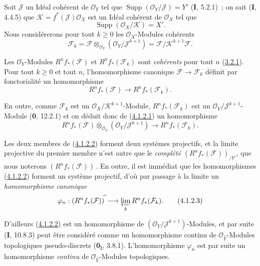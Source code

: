 \begin{env}[4.1.2]
\label{III.4.1.2-fr}
Soit $\mathcal J$ un Idéal cohérent de $\mathcal O_Y$ tel que
$\operatorname{Supp}(\mathcal O_Y/\mathcal J)=Y'$ (\textbf{I}, 5.2.1)~; on sait
(\textbf{I}, 4.4.5) que
$\mathcal K=f^*(\mathcal J)\mathcal O_X$
est un Idéal cohérent de $\mathcal O_X$ tel que
\[
\operatorname{Supp}(\mathcal O_X/\mathcal K)=X'.
\]
Nous considérerons pour tout $k\geq0$ les $\mathcal O_X$-Modules cohérents
\[
\mathcal F_k
=\mathcal F\otimes_{\mathcal O_Y}(\mathcal O_Y/\mathcal J^{k+1})
=\mathcal F/\mathcal K^{k+1}\mathcal F.
\]

Les $\mathcal O_Y$-Modules $R^nf_*(\mathcal F)$ et
$R^nf_*(\mathcal F_k)$ sont \emph{cohérents} pour tout $n$
(\hyperref[III.3.2.1-fr]{3.2.1}). Pour tout $k\geq0$ et tout $n$,
l'homomorphisme canonique $\mathcal F\to\mathcal F_k$ définit par
fonctorialité un homomorphisme
\[
R^nf_*(\mathcal F)\longrightarrow R^nf_*(\mathcal F_k).
\tag{4.1.2.1}\label{III.4.1.2.1-fr}
\]

En outre, comme $\mathcal F_k$ est un
$\mathcal O_X/\mathcal K^{k+1}$-Module, $R^nf_*(\mathcal F_k)$ est un
$\mathcal O_Y/\mathcal J^{k+1}$-Module (\textbf{0}, 12.2.1) et on déduit donc de
(\hyperref[III.4.1.2.1-fr]{4.1.2.1}) un homomorphisme
\[
R^nf_*(\mathcal F)\otimes_{\mathcal O_Y}
(\mathcal O_Y/\mathcal J^{k+1})
\longrightarrow R^nf_*(\mathcal F_k).
\tag{4.1.2.2}\label{III.4.1.2.2-fr}
\]

Les deux membres de (\hyperref[III.4.1.2.2-fr]{4.1.2.2}) forment deux
systèmes projectifs, et la limite projective du premier membre n'est autre
que le \emph{complété} $(R^nf_*(\mathcal F))_{/Y'}$, que nous noterons
$(R^nf_*(\mathcal F))^{\widehat{\,}}$. En outre, il est immédiat que les
homomorphismes (\hyperref[III.4.1.2.2-fr]{4.1.2.2}) forment un système
projectif, d'où par passage à la limite un \emph{homomorphisme canonique}
\[
\varphi_n:(R^nf_*(\mathcal F))^{\widehat{\,}}
\longrightarrow\varprojlim_kR^nf_*(\mathcal F_k).
\tag{4.1.2.3}\label{III.4.1.2.3-fr}
\]

D'ailleurs (\hyperref[III.4.1.2.2-fr]{4.1.2.2}) est un homomorphisme de
$(\mathcal O_Y/\mathcal J^{k+1})$-Modules, et par suite (\textbf{I}, 10.8.3) peut
être considéré comme un homomorphisme continu de
$\mathcal O_{\widehat Y}$-Modules topologiques pseudo-discrets
(\textbf{0}\textsubscript{I}, 3.8.1). L'homomorphisme $\varphi_n$ est par suite un
homomorphisme \emph{continu} de $\mathcal O_{\widehat Y}$-Modules topologiques.
\end{env}

